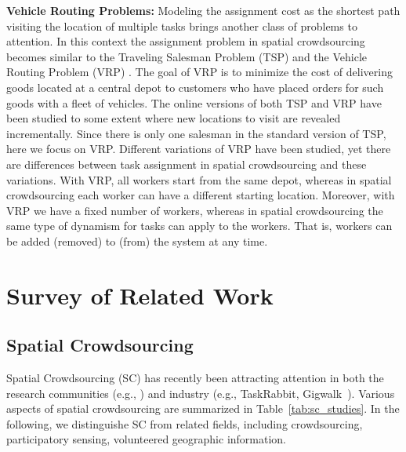 \documentclass{USC-Thesis}
\numberwithin{equation}{chapter}
\begin{document}
\textbf{Vehicle Routing Problems:} Modeling the assignment cost as the shortest path visiting the location of multiple tasks brings another class of problems to attention. In this context the assignment problem in spatial crowdsourcing becomes similar to the Traveling Salesman Problem (TSP) \cite{lawler1985traveling} and the Vehicle Routing Problem (VRP) \cite{toth2001vehicle}. The goal of VRP is to minimize the cost of delivering goods located at a central depot to customers who have placed orders for such goods with a fleet of vehicles.  The online versions of both TSP and VRP have been studied to some extent where new locations to visit are revealed incrementally. Since there is only one salesman in the standard version of TSP, here we focus on VRP. Different variations of VRP have been studied, yet there are differences between task assignment in spatial crowdsourcing and these variations.
With VRP, all workers start from the same depot, whereas in spatial crowdsourcing each worker can have a different starting location. Moreover, with VRP we have a fixed number of workers, whereas in spatial crowdsourcing the same type of dynamism for tasks can apply to the workers. That is, workers can be added (removed) to (from) the system at any time.

\chapter{Survey of Related Work}
\section{Spatial Crowdsourcing}
Spatial Crowdsourcing (SC) has recently been attracting attention in both the research communities (e.g., \cite{kazemi2012geocrowd,deng2013maximizing,to2014framework,to2016real,to2016sc}) and industry (e.g., TaskRabbit, Gigwalk~\cite{musthag2013labor}).
Various aspects of spatial crowdsourcing are summarized in Table~\ref{tab:sc_studies}.
In the following, we distinguishe SC from related fields, including crowdsourcing, participatory sensing, volunteered geographic information.
\end{document}
